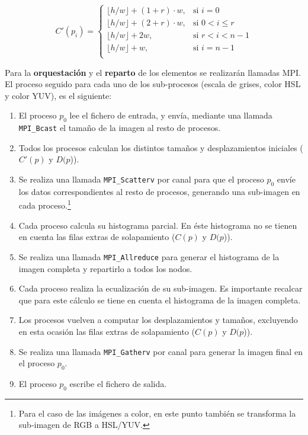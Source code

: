 \begin{equation}\label{eq:count_}
  C'(p_i) =
  \begin{cases}
    \lfloor h/w\rfloor + (1+r) \cdot w ,& \text{si } i = 0\\
    \lfloor h/w\rfloor + (2+r) \cdot w,& \text{si } 0 < i \le r\\
    \lfloor h/w\rfloor + 2w,& \text{si } r < i < n - 1\\
    \lfloor h/w\rfloor + w,& \text{si } i = n - 1\\
  \end{cases}
\end{equation}



Para la \textbf{orquestación} y el \textbf{reparto} de los elementos se realizarán llamadas MPI. El proceso seguido para cada uno de los sub-procesos (escala de grises, color HSL y color YUV), es el siguiente:
\begin{enumerate}
  \item El proceso $p_0$ lee el fichero de entrada, y envía, mediante una llamada \texttt{MPI\_Bcast} el tamaño de la imagen al resto de procesos.
  \item Todos los procesos calculan los distintos tamaños y desplazamientos iniciales ($C'(p)$ y $D(p$)).
  \item Se realiza una llamada \texttt{MPI\_Scatterv} por canal para que el proceso $p_0$ envíe los datos correspondientes al resto de procesos, generando una sub-imagen en cada proceso.\footnote{Para el caso de las imágenes a color, en este punto también se transforma la sub-imagen de RGB a HSL/YUV.}
  \item Cada proceso calcula su histograma parcial. En éste histograma no se tienen en cuenta las filas extras de solapamiento ($C(p)$ y $D(p$)).
  \item Se realiza una llamada \texttt{MPI\_Allreduce} para generar el histograma de la imagen completa y repartirlo a todos los nodos.
  \item Cada proceso realiza la ecualización de su sub-imagen. Es importante recalcar que para este cálculo se tiene en cuenta el histograma de la imagen completa.
  \item Los procesos vuelven a computar los desplazamientos y tamaños, excluyendo en esta ocasión las filas extras de solapamiento ($C(p)$ y $D(p$)).
  \item Se realiza una llamada \texttt{MPI\_Gatherv} por canal para generar la imagen final en el proceso $p_0$.
  \item El proceso $p_0$ escribe el fichero de salida.
\end{enumerate}